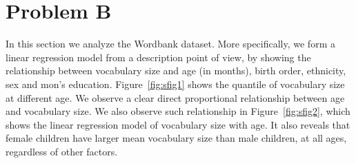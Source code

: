 \documentclass[12pt]{elsarticle}
\begin{document}
\section{Problem B}
\label{PB}
In this section we analyze the Wordbank dataset. More specifically, we form a linear regression model from a description point of view, by showing the relationship between vocabulary size and age (in months), birth order, ethnicity, sex and mon's education. Figure~\ref{fig:sfig1} shows the quantile of vocabulary size at different age. We observe a clear direct proportional relationship between age and vocabulary size. We also observe such relationship in Figure~\ref{fig:sfig2}, which shows the linear regression model of vocabulary size with age. It also reveals that female children have larger mean vocabulary size than male children, at all ages, regardless of other factors.
\end{document}
